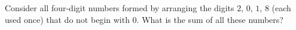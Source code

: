 Consider all four-digit numbers formed by arranging the digits $2$, $0$, $1$, $8$ (each used once) that do not begin with $0$. What is the sum of all these numbers?
